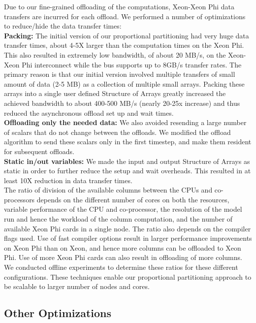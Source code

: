 Due to our fine-grained offloading of the computations, Xeon-Xeon Phi data transfers are incurred for each offload. We performed a number of optimizations to reduce/hide the data transfer times: \\
{\bf Packing:} The initial version of our proportional partitioning had very huge data transfer times, about 4-5X larger than the computation times on the Xeon Phi. This also resulted in extremely low bandwidth, of about 20 MB/s, on the Xeon-Xeon Phi interconnect while the bus supports up to 8GB/s transfer rates. The primary reason is that our initial version involved multiple transfers of small amount of data (2-5 MB) as a collection of multiple small arrays. Packing these arrays into a single user defined Structure of Arrays greatly increased the achieved bandwidth to about 400-500 MB/s (nearly 20-25x increase) and thus reduced the asynchronous offload set up and wait times. \\
{\bf Offloading only the needed data:} We also avoided resending a large number of scalars that do not change between the offloads. We modified the offload algorithm to send these scalars only in the first timestep, and make them resident for subsequent offloads. \\
{\bf Static in/out variables:} We made the input and output Structure of Arrays as static in order to further reduce the setup and wait overheads. This resulted in at least 10X reduction in data transfer times. \\
The ratio of division of the available columns between the CPUs and co-processors depends on the different number of cores on both the resources, variable performance of the CPU and co-processor, the resolution of the model run and hence the workload of the column computation, and the number of available Xeon Phi cards in a single node. The ratio also depends on the compiler flags used. Use of fast compiler options result in larger performance improvements on Xeon Phi than on Xeon, and hence more columns can be offloaded to Xeon Phi. Use of more Xeon Phi cards can also result in offloading of more columns. We conducted offline experiments to determine these ratios for these different configurations.
These techniques enable our proportional partitioning approach to be scalable to larger number of nodes and cores.


\subsection{Other Optimizations}

